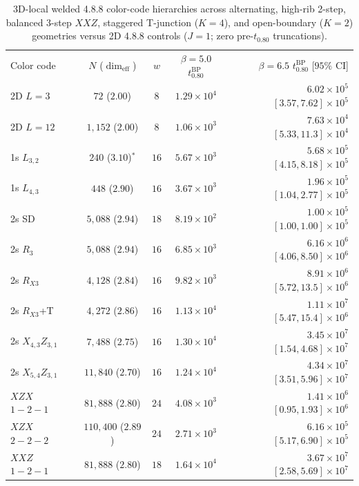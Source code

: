 \documentclass[aps,prx,reprint,superscriptaddress,nofootinbib,floatfix]{revtex4-2}
\begin{document}
\begin{table}[!htbp]
\caption{3D-local welded 4.8.8 color-code hierarchies across alternating, high-rib 2-step, balanced 3-step $XXZ$, staggered T-junction ($K = 4$), and open-boundary ($K = 2$) geometries versus 2D 4.8.8 controls ($J = 1$; zero pre-$t_{0.80}$ truncations).}
\label{tab:color}
{\scriptsize
\setlength{\tabcolsep}{0.1pt}
\begin{ruledtabular}
\begin{tabular}{lcccr}
Color code & $N$ ($\dim_{\mathrm{eff}}$) & $w$ & $\beta{=}5.0$ $t_{0.80}^{\mathrm{BP}}$ & $\beta{=}6.5$ $t_{0.80}^{\mathrm{BP}}$ [$95\%$ CI] \\
\colrule
2D $L{=}3$ & $72$ ($2.00$) & $8$ & $1.29{\times}10^4$ & $6.02{\times}10^5$ $[3.57, 7.62]{\times}10^5$ \\
2D $L{=}12$ & $1{,}152$ ($2.00$) & $8$ & $1.06{\times}10^3$ & $7.63{\times}10^4$ $[5.33, 11.3]{\times}10^4$ \\
1s $L_{3,2}$ & $240$ ($3.10$)$^*$ & $16$ & $5.67{\times}10^3$ & $5.68{\times}10^5$ $[4.15, 8.18]{\times}10^5$ \\
1s $L_{4,3}$ & $448$ ($2.90$) & $16$ & $3.67{\times}10^3$ & $1.96{\times}10^5$ $[1.04, 2.77]{\times}10^5$ \\
2s SD & $5{,}088$ ($2.94$) & $18$ & $8.19{\times}10^2$ & $1.00{\times}10^5$ $[1.00, 1.00]{\times}10^5$ \\
2s $R_3$ & $5{,}088$ ($2.94$) & $16$ & $6.85{\times}10^3$ & $6.16{\times}10^6$ $[4.06, 8.50]{\times}10^6$ \\
2s $R_{X3}$ & $4{,}128$ ($2.84$) & $16$ & $9.82{\times}10^3$ & $8.91{\times}10^6$ $[5.72, 13.5]{\times}10^6$ \\
2s $R_{X3}$+T & $4{,}272$ ($2.86$) & $16$ & $1.13{\times}10^4$ & $1.11{\times}10^7$ $[5.47, 15.4]{\times}10^6$ \\
2s $X_{4,3}Z_{3,1}$ & $7{,}488$ ($2.75$) & $16$ & $1.30{\times}10^4$ & $3.45{\times}10^7$ $[1.54, 4.68]{\times}10^7$ \\
2s $X_{5,4}Z_{3,1}$ & $11{,}840$ ($2.70$) & $16$ & $1.24{\times}10^4$ & $4.34{\times}10^7$ $[3.51, 5.96]{\times}10^7$ \\
\colrule
$XZX$ $1{-}2{-}1$ & $81{,}888$ ($2.80$) & $24$ & $4.08{\times}10^3$ & $1.41{\times}10^6$ $[0.95, 1.93]{\times}10^6$ \\
$XZX$ $2{-}2{-}2$ & $110{,}400$ ($2.89$) & $24$ & $2.71{\times}10^3$ & $6.16{\times}10^5$ $[5.17, 6.90]{\times}10^5$ \\
$XXZ$ $1{-}2{-}1$ & $81{,}888$ ($2.80$) & $18$ & $1.64{\times}10^4$ & $3.67{\times}10^7$ $[2.58, 5.69]{\times}10^7$ \\

\end{tabular}
\end{ruledtabular}}
\end{table}
\end{document}
